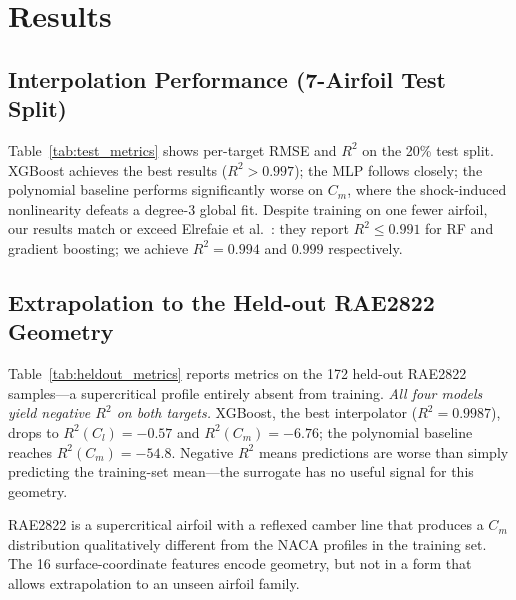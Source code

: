 \documentclass[11pt]{article}
\begin{document}
\section{Results}

\subsection{Interpolation Performance (7-Airfoil Test Split)}

Table~\ref{tab:test_metrics} shows per-target RMSE and $R^2$ on the 20\%
test split. XGBoost achieves the best results ($R^2 > 0.997$); the MLP
follows closely; the polynomial baseline performs significantly worse on
$C_m$, where the shock-induced nonlinearity defeats a degree-3 global fit.
Despite training on one fewer airfoil, our results match or exceed
Elrefaie et al.\ \cite{elrefaie2024}: they report $R^2 \leq 0.991$ for RF
and gradient boosting; we achieve $R^2 = 0.994$ and $0.999$ respectively.

\begin{table}[ht]
  \centering
  \caption{Interpolation test-split metrics ($N=238$, 7-airfoil pool)}
  \label{tab:test_metrics}
  
\end{table}

\subsection{Extrapolation to the Held-out RAE2822 Geometry}\label{sec:holdout}

Table~\ref{tab:heldout_metrics} reports metrics on the 172 held-out
RAE2822 samples---a supercritical profile entirely absent from training.
\emph{All four models yield negative $R^2$ on both targets.} XGBoost,
the best interpolator ($R^2=0.9987$), drops to $R^2(C_l)=-0.57$ and
$R^2(C_m)=-6.76$; the polynomial baseline reaches $R^2(C_m)=-54.8$.
Negative $R^2$ means predictions are worse than simply predicting the
training-set mean---the surrogate has no useful signal for this geometry.

RAE2822 is a supercritical airfoil with a reflexed camber line that produces
a $C_m$ distribution qualitatively different from the NACA profiles in the
training set. The 16 surface-coordinate features encode geometry, but not in
a form that allows extrapolation to an unseen airfoil family.

\begin{table}[ht]
  \centering
  \caption{Held-out RAE2822 metrics ($N=172$, unseen geometry)}
  \label{tab:heldout_metrics}
  
\end{table}
\end{document}
